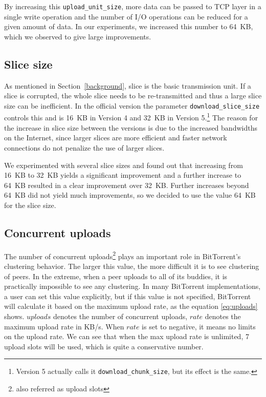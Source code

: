 \documentclass[10pt,letterpaper,twocolumn]{article}
\begin{document}
By increasing this \texttt{upload\_unit\_size}, more data can be passed to TCP
layer in a single write operation and the number of I/O operations can
be reduced for a given amount of data. In our experiments, we
increased this number to 64~KB, which we observed to give large improvements.

\subsection{Slice size}
\label{sec:slice-size}

As mentioned in Section~\ref{background}, slice is the basic
transmission unit. If a slice is corrupted, the whole slice needs to
be re-transmitted and thus a large slice size can be inefficient. In
the official version the parameter \texttt{download\_slice\_size}
controls this and is 16~KB in Version 4 and 32~KB in Version
5.\footnote{Version 5 actually calls it
  \texttt{download\_chunk\_size}, but its effect is the same.} The
reason for the increase in slice size between the versions is due to
the increased bandwidths on the Internet, since larger slices are more
efficient and faster network connections do not penalize the use of
larger slices.
  








We experimented with several slice sizes and found out that increasing
from 16~KB to 32~KB yields a significant improvement and a further
increase to 64~KB resulted in a clear improvement over 32~KB. Further
increases beyond 64~KB did not yield much improvements, so we decided
to use the value 64~KB for the slice size.



\subsection{Concurrent uploads}
\label{concurrent_uploads}

The number of concurrent uploads\footnote{also referred as upload
  slots} plays an important role in BitTorrent's clustering behavior.
The larger this value, the more difficult it is to see clustering of
peers. In the extreme, when a peer uploads to all of its buddies, it
is practically impossible to see any clustering. In many BitTorrent
implementations, a user can set this value explicitly, but if this
value is not specified, BitTorrent will calculate it based on the
maximum upload rate, as the equation \eqref{eq:uploads} shows.
$uploads$ denotes the number of concurrent uploads, $rate$ denotes the
maximum upload rate in KB/s. When $rate$ is set to negative, it means
no limits on the upload rate. We can see that when the max upload rate
is unlimited, 7 upload slots will be used, which is quite a
conservative number.
\end{document}
